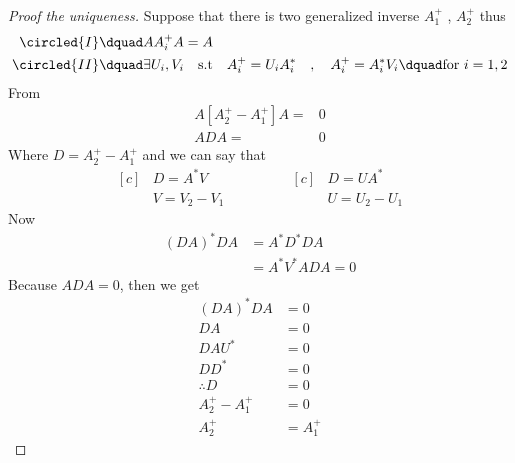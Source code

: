 \begin{proof}[\textcolor{theme}{Proof the uniqueness}]
        Suppose that there is two generalized inverse $A_1^{+}$ , $A_2^{+}$ thus
        \begin{align*}
                \circled{I}& \dquad AA_i^{+}A = A
                \\
                \circled{II}& \dquad \exists  U_i,V_i \quad \text{s.t} \quad A_i^{+} = U_i A_i^{*} \quad,\quad A_i^{+} = A_i^{*}V_i \dquad \text{for }i=1,2
        \end{align*}
From  
\begin{align*}
        A[A_2^{+}-A_1^{+}]A =& 0
        \\
        ADA=&0
\end{align*}
Where $D = A_2^{+}-A_1^{+}$ and we can say that 
\begin{equation*}
        \begin{aligned}[c]
            &D = A^{*}V
            \\
            &V = V_2-V_1
        \end{aligned}
        \qquad\qquad
        \begin{aligned}[c]
        &D = UA^{*}
        \\
        &U = U_2-U_1
        \end{aligned}
    \end{equation*}
Now
\begin{align*}
        (DA)^{*}DA &= A^* D^{*} D A
        \\
        &= A^* V^{*}A D A = 0
\end{align*}
Because $ADA=0$, then we get 
\begin{align*}
        (DA)^{*}DA &= 0
        \\
        DA &= 0 \tag{multiply $U^*$ from the right}
        \\
        DA U^*&= 0
        \\
        DD^{*}&= 0
        \\
        \therefore D &= 0
        \\
        A_2^{+}-A_1^{+} &= 0
        \\
        A_2^{+} &=A_1^{+}
\end{align*}
\end{proof}

